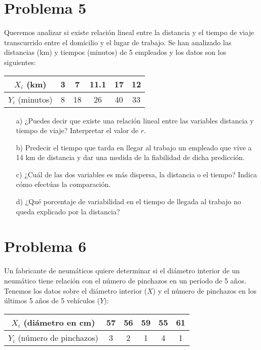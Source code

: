 \documentclass[fleqn]{article}
\begin{document}
	\section{Problema 5}
	Queremos analizar si existe relación lineal entre la distancia y el tiempo de viaje transcurrido entre el domicilio y el lugar de trabajo. Se han analizado las distancias (km) y tiempos (minutos) de 5 empleados y los datos son los siguientes:
	
	\begin{table}[h!]
		\centering
		\begin{tabular}{|c|c|c|c|c|c|}
			\hline
			\( X_i \) (km) & 3 & 7 & 11.1 & 17 & 12 \\ \hline
			\( Y_i \) (minutos) & 8 & 18 & 26 & 40 & 33 \\ \hline
		\end{tabular}
	\end{table}
	
	\begin{enumerate}
		\item[a)] ¿Puedes decir que existe una relación lineal entre las variables distancia y tiempo de viaje? Interpretar el valor de  $r$.
		
		\item[b)] Predecir el tiempo que tarda en llegar al trabajo un empleado que vive a 14 km de distancia y dar una medida de la fiabilidad de dicha predicción.
		
		\item[c)] ¿Cuál de las dos variables es más dispersa, la distancia o el tiempo? Indica cómo efectúas la comparación.
		
		\item[d)] ¿Qué porcentaje de variabilidad en el tiempo de llegada al trabajo no queda explicado por la distancia?
	\end{enumerate}
	\section{Problema 6}
	Un fabricante de neumáticos quiere determinar si el diámetro interior de un neumático tiene relación con el número de pinchazos en un período de 5 años. Tenemos los datos sobre el diámetro interior (\( X \)) y el número de pinchazos en los últimos 5 años de 5 vehículos (\( Y \)):
	
	\begin{table}[h!]
		\centering
		\begin{tabular}{|c|c|c|c|c|c|}
			\hline
			\( X_i \) (diámetro en cm) & 57 & 56 & 59 & 55 & 61 \\ \hline
			\( Y_i \) (número de pinchazos) & 3 & 2 & 1 & 4 & 1 \\ \hline
		\end{tabular}
	\end{table}
	
\end{document}
